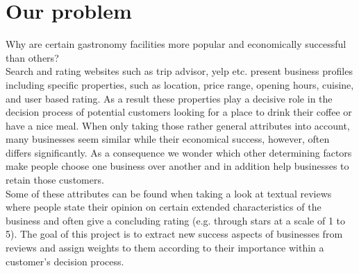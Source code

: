 \section{Our problem}
\label{cha:problem}

Why are certain gastronomy facilities more popular and economically successful than others?\\  
Search and rating websites such as trip advisor, yelp etc. present business profiles including specific properties, such as location, price range, opening hours, cuisine, and user based rating. As a result these properties play a decisive role in the decision process of potential customers looking for a place to drink their coffee or have a nice meal. When only taking those rather general attributes into account, many businesses seem similar while their economical success, however, often differs significantly. As a consequence we wonder which other determining factors make people choose one business over another and in addition help businesses to retain those customers. \\
Some of these attributes can be found when taking a look at textual reviews where people state their opinion on certain extended characteristics of the business and often give a concluding rating (e.g. through stars at a scale of 1 to 5). The goal of this project is to extract new success aspects of businesses from reviews and assign weights to them according to their importance within a customer's decision process.\\
